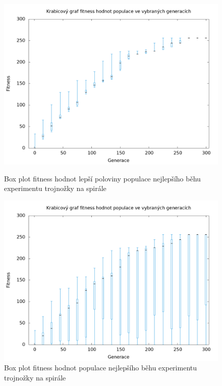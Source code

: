 \begin{figure}[h]
    \begin{minipage}[c]{0.48\linewidth}
        \includegraphics[width=\linewidth]{obrazky/bar_whisker_trojnozka_spirala_top50.png}
        \caption{Box plot fitness hodnot lepší poloviny populace nejlepšího běhu experimentu trojnožky na spirále}
    \end{minipage}
    \hfill
    \begin{minipage}[c]{0.48\linewidth}
        \includegraphics[width=\linewidth]{obrazky/bar_whisker_trojnozka_spirala.png}
        \caption{Box plot fitness hodnot populace nejlepšího běhu experimentu trojnožky na spirále}
    \end{minipage}
\end{figure}



